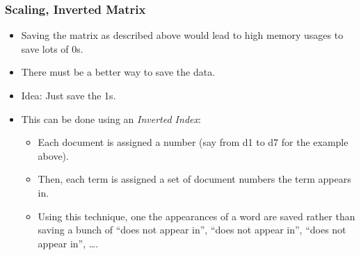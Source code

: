             \subsubsection{Scaling, Inverted Matrix} %
            	\begin{itemize}
            		\item Saving the matrix as described above would lead to high memory usages to save lots of 0s.
            		\item There must be a better way to save the data.
            		\item Idea: Just save the 1s.
            		\item This can be done using an \textit{Inverted Index}:
            			\begin{itemize}
            				\item Each document is assigned a number (say from d1 to d7 for the example above).
            				\item Then, each term is assigned a set of document numbers the term appears in.
            				\item Using this technique, one the appearances of a word are saved rather than saving a bunch of \enquote{does not appear in}, \enquote{does not appear in}, \enquote{does not appear in}, \dots.
            			\end{itemize}
            	\end{itemize}
            
